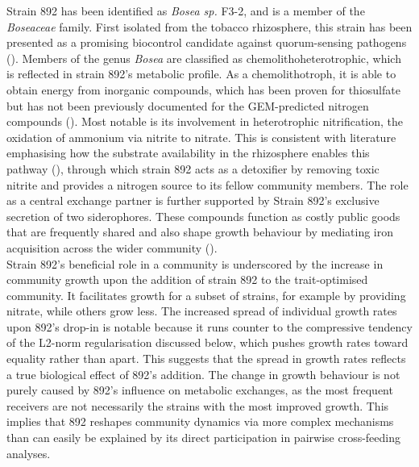 Strain 892 has been identified as \textit{Bosea sp.} F3-2, and is a member of the \textit{Boseaceae} family. First isolated from the tobacco rhizosphere, this strain has been presented as a promising biocontrol candidate against quorum-sensing pathogens (\cite{zhang_aidb_2019}). Members of the genus \textit{Bosea} are classified as chemolithoheterotrophic, which is reflected in strain 892's metabolic profile. As a chemolithotroph, it is able to obtain energy from inorganic compounds, which has been proven for thiosulfate but has not been previously documented for the GEM-predicted nitrogen compounds (\cite{das_oxidation_1996}). Most notable is its involvement in heterotrophic nitrification, the oxidation of ammonium via nitrite to nitrate. This is consistent with literature emphasising how the substrate availability in the rhizosphere enables this pathway (\cite{martikainen_heterotrophic_2022}), through which strain 892 acts as a detoxifier by removing toxic nitrite and provides a nitrogen source to its fellow community members. 
The role as a central exchange partner is further supported by Strain 892's exclusive secretion of two siderophores. These compounds function as costly public goods that are frequently shared and also shape growth behaviour by mediating iron acquisition across the wider community (\cite{kramer_bacterial_2020}). 
\\


Strain 892’s beneficial role in a community is underscored by the increase in community growth upon the addition of strain 892 to the trait-optimised community. It facilitates growth for a subset of strains, for example by providing nitrate, while others grow less. The increased spread of individual growth rates upon 892's drop-in is notable because it runs counter to the compressive tendency of the L2-norm regularisation discussed below, which pushes growth rates toward equality rather than apart. This suggests that the spread in growth rates reflects a true biological effect of 892's addition. The change in growth behaviour is not purely caused by 892’s influence on metabolic exchanges, as the most frequent receivers are not necessarily the strains with the most improved growth. This implies that 892 reshapes community dynamics via more complex mechanisms than can easily be explained by its direct participation in pairwise cross-feeding analyses.
\\


